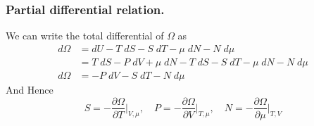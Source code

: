 \documentclass[../../../Main.tex]{subfiles}
\begin{document}
\subsubsection{Partial differential relation.} We can write the total differential of $\Omega$ as 
\begin{align*}
    d\Omega&= dU-T\;dS- S\;dT-\mu \;dN-N\;d\mu\\
    &=T\;dS-P\;dV+\mu\;dN-T\;dS- S\;dT-\mu \;dN-N\;d\mu\\
    d\Omega&=-P\;dV-S\;dT-N\;d\mu
\end{align*}
And Hence 
\begin{equation*}
    S=-\frac{\partial \Omega}{\partial T}\bigg|_{V,\mu},\quad P=-\frac{\partial \Omega}{\partial V}\bigg|_{T,\mu},\quad N=-\frac{\partial \Omega}{\partial \mu}\bigg|_{T,V}
\end{equation*}
\end{document}
